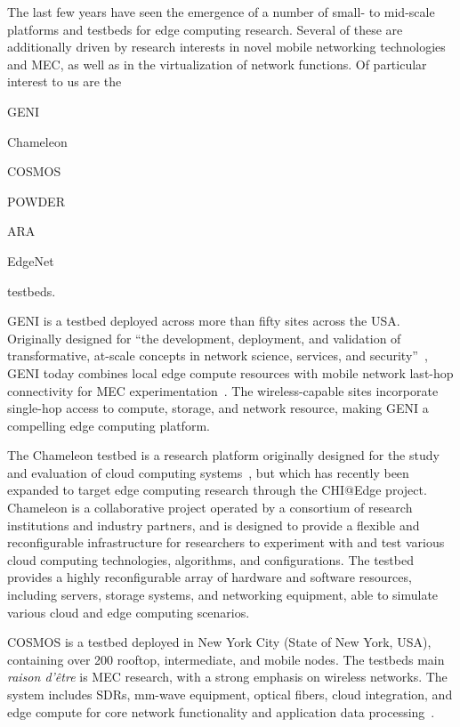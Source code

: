 The last few years have seen the emergence of a number of small- to mid-scale platforms and testbeds for edge computing research.
Several of these are additionally driven by research interests in novel mobile networking technologies and \gls{MEC}, as well as in the virtualization of network functions.
Of particular interest to us are the
\begin{inlineenum}
    \item \acs{GENI}
    \item Chameleon
    \item \acs{COSMOS}
    \item \acs{POWDER}
    \item \acs{ARA}
    \item EdgeNet
\end{inlineenum} testbeds.

\gls{GENI} is a testbed deployed across more than fifty sites across the \gls{USA}.
Originally designed for ``the development, deployment, and validation of transformative, at-scale concepts in network science, services, and security''~\cite{berman2014geni}, \gls{GENI} today combines local edge compute resources with mobile network last-hop connectivity for \gls{MEC} experimentation~\cite{gosain2017geni}.
The wireless-capable sites incorporate single-hop access to compute, storage, and network resource, making \gls{GENI} a compelling edge computing platform.

The Chameleon testbed is a research platform originally designed for the study and evaluation of cloud computing systems~\cite{keahey2020lessons}, but which has recently been expanded to target edge computing research through the \acs{CHI}@Edge project.
Chameleon is a collaborative project operated by a consortium of research institutions and industry partners, and is designed to provide a flexible and reconfigurable infrastructure for researchers to experiment with and test various cloud computing technologies, algorithms, and configurations.
The testbed provides a highly reconfigurable array of hardware and software resources, including servers, storage systems, and networking equipment, able to simulate various cloud and edge computing scenarios.

\gls{COSMOS} is a testbed deployed in New York City (State of New York, \gls{USA}), containing over \num{200} rooftop, intermediate, and mobile nodes.
The testbeds main \emph{raison d'être} is \gls{MEC} research, with a strong emphasis on wireless networks.
The system includes \glspl{SDR}, \si{\milli\meter}-wave equipment, optical fibers, cloud integration, and edge compute for core network functionality and application data processing~\cite{yu2019cosmos,raychaudhuri2020challenge}.

